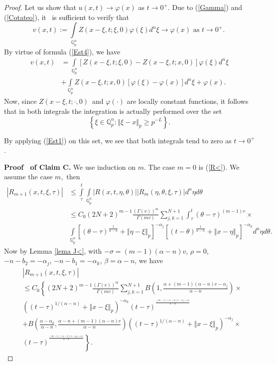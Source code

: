 \documentclass{amsart}\usepackage{amsfonts}
\theoremstyle{plain}
\numberwithin{equation}{section}
\begin{document}
\begin{proof}
Let us show that $u(x,t)\rightarrow\varphi(x)$ as $t\rightarrow0^{+}$. Due to
(\ref{Gamma}) and (\ref{Cotateo}), it \ is sufficient to verify that
\[
v(x,t):={\displaystyle\int\limits_{\mathbb{Q}_{p}^{n}}}
Z(x-\xi,t;\xi,0)\varphi(\xi)d^{n}\xi\rightarrow\varphi(x)\text{ \ as
\ }t\rightarrow0^{+}.\
\]
By virtue of formula (\ref{Est4}), we have
\begin{align*}
v(x,t)  &  ={\displaystyle\int\limits_{\mathbb{Q}_{p}^{n}}}
\left[  Z(x-\xi,t;\xi,0)-Z(x-\xi,t;x,0)\right]  \varphi(\xi)d^{n}\xi\\
&  +{\displaystyle\int\limits_{\mathbb{Q}_{p}^{n}}}
Z(x-\xi,t;x,0)\left[  \varphi(\xi)-\varphi(x)\right]  d^{n}\xi+\varphi(x).
\end{align*}
Now, since $Z(x-\xi,t;\cdot,0)$\ and $\varphi(\cdot)$ are locally constant
functions, it follows that in both integrals the integration is actually
performed over the set\[
\left\{  \xi\in\mathbb{Q}_{p}^{n}:\left\Vert \xi-x\right\Vert _{p}\geq
p^{-L}\right\}  .
\]


By applying (\ref{Est1}) on this set, we see that both integrals tend to zero
as $t\rightarrow0^{+}$.

\textbf{Proof \ of Claim C. }We use induction on $m$. The case $m=0$ is
(\ref{R<}). We assume the case $m$,\ then\begin{align*}
\left\vert R_{m+1}(x,t,\xi,\tau)\right\vert  &  \leq{\displaystyle\int\limits_{\tau}^{t}}
\underset{\mathbb{Q}_{p}^{n}}{\int}\left\vert R(x,t,\eta,\theta)\right\vert
\left\vert R_{m}(\eta,\theta,\xi,\tau)\right\vert d^{n}\eta d\theta\\
&  \leq C_{0}(2N+2)^{m-1}\frac{\left(  \Gamma(v)\right)  ^{m}}{\Gamma(mv)}{\displaystyle\sum\limits_{j,k=1}^{N+1}}
\int_{\tau}^{t}(\theta-\tau)^{(m-1)v}\times\\
&  \underset{\mathbb{Q}_{p}^{n}}{\int}\left[  (\theta-\tau)^{\frac{1}{\alpha-n}}+\left\Vert \eta-\xi\right\Vert _{p}\right]  ^{-\alpha_{j}}\left[
(t-\theta)^{\frac{1}{\alpha-n}}+\left\Vert x-\eta\right\Vert _{p}\right]
^{-\alpha_{k}}d^{n}\eta d\theta.
\end{align*}
Now by Lemma \ref{lema J<}, with $-\sigma=(m-1)(\alpha-n)v$, $\rho
=0$,\ $-n-b_{2}=-\alpha_{j}$, $-n-b_{1}=-\alpha_{k}$, $\beta=\alpha-n$, we
have\begin{align*}
&  \left\vert R_{m+1}(x,t,\xi,\tau)\right\vert \\
&  \leq C_{0}\left\{  (2N+2)^{m-1}\frac{\left(  \Gamma(v)\right)  ^{m}}{\Gamma(mv)}{\displaystyle\sum\limits_{j,k=1}^{N+1}}
B\left(  1,\frac{\alpha+(m-1)(\alpha-n)v-\alpha_{j}}{\alpha-n}\right)
\times\right. \\
&  \left(  (t-\tau)^{1/(\alpha-n)}+\left\Vert x-\xi\right\Vert _{p}\right)
^{-\alpha_{k}}(t-\tau)^{^{\frac{(m-1)(\alpha-n)v-\alpha_{j}+\alpha)}{\alpha
-n}}}\\
&  +B\left(  \frac{\alpha-\alpha_{k}}{\alpha-n},\frac{\alpha-n+(m-1)(\alpha
-n)v}{\alpha-n}\right)  \left(  (t-\tau)^{1/(\alpha-n)}+\left\Vert
x-\xi\right\Vert _{p}\right)  ^{-\alpha_{j}}\times\\
&  \left.  (t-\tau)^{^{\frac{(m-1)(\alpha-n)v-\alpha_{k}+\alpha)}{\alpha-n}}}\right\}  .
\end{align*}



\end{proof}
\end{document}

